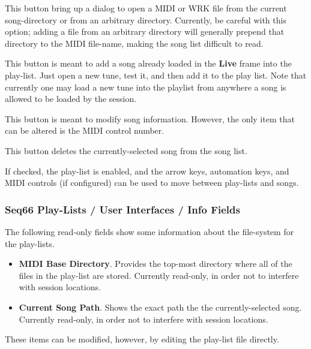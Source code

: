    \setcounter{ItemCounter}{0}      %

   This button bring up a dialog to open a MIDI or WRK file from
   the current song-directory or from an arbitrary directory.
   Currently, be careful with this option; adding a file from an arbitrary
   directory will generally prepend that directory to the MIDI file-name,
   making the song list difficult to read.

   This button is meant to add a song already loaded in the \textbf{Live} frame
   into the play-list.  Just open a new tune, test it, and then add it to the
   play list.  Note that currently one may load a new tune into the playlist
   from anywhere a song is allowed to be loaded by the session.

   This button is meant to modify song information.  However, the only item
   that can be altered is the MIDI control number.

   This button deletes the currently-selected song from the song list.

   If checked, the play-list is enabled, and the arrow keys, automation keys,
   and MIDI controls (if configured) can be used to move between play-lists and
   songs.

\subsubsection{Seq66 Play-Lists / User Interfaces / Info Fields}
\label{subsubsec:playlist_ui_info_fields}

   The following read-only fields show some information about the file-system
   for the play-lists.

   \begin{itemize}
      \item \textbf{MIDI Base Directory}.
         Provides the top-most directory where all of the files in the
         play-list are stored.
         Currently read-only, in order not to interfere with session locations.
      \item \textbf{Current Song Path}.
         Shows the exact path the the currently-selected song.
         Currently read-only, in order not to interfere with session locations.
   \end{itemize}

   These items can be modified, however, by editing the play-list file
   directly.

